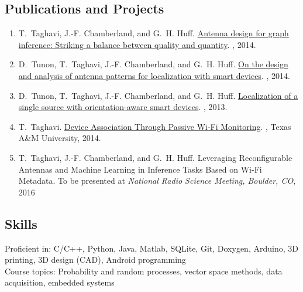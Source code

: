 \documentclass[11pt]{article}
\begin{document}
\subsection*{Publications and Projects}

\begin{enumerate}    \itemsep0pt

\item T.~Taghavi, J.-F. Chamberland, and G.~H. Huff.
\newblock \href{http://dx.doi.org/10.1109/USNC-URSI-NRSM.2014.6927995}{Antenna design for graph inference: Striking a balance between quality and quantity}.
, 2014.

\item D.~Tunon, T.~Taghavi, J.-F. Chamberland, and G.~H. Huff.
\newblock \href{http://dx.doi.org/10.1109/USNC-URSI-NRSM.2014.6928007}{On the design and analysis of antenna patterns for localization with smart devices}.
, 2014.

\item D.~Tunon, T.~Taghavi, J.-F. Chamberland, and G.~H. Huff.
\newblock \href{http://dx.doi.org/10.1109/GlobalSIP.2013.6736829}{Localization of a single source with orientation-aware smart devices}.
, 2013.

\item T.~Taghavi.
\newblock \href{http://hdl.handle.net/1969.1/152045}{Device Association Through Passive Wi-Fi Monitoring}.
, Texas A\&M University, 2014.

\item T.~Taghavi, J.-F. Chamberland, and G.~H. Huff.
\newblock Leveraging Reconfigurable Antennas and Machine Learning in Inference Tasks Based on Wi-Fi Metadata.
\newblock To be presented at {\em National Radio Science Meeting, Boulder, CO}, 2016

\end{enumerate}

\subsection*{Skills}

Proficient in: C/C++, Python, Java, Matlab, SQLite, Git, Doxygen, Arduino, 3D printing, 3D design (CAD), Android programming \\
Course topics: Probability and random processes, vector space methods, data acquisition, embedded systems\\
\end{document}

